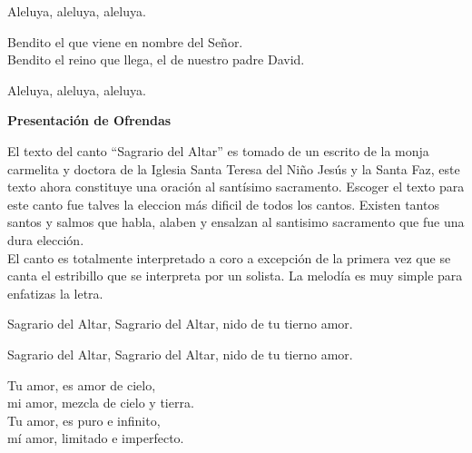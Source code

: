 \documentclass[12pt, letterpaper]{report}
\begin{document}
    \noindent
    \LARGE Aleluya, aleluya, aleluya.

    \noindent
    Bendito el que viene en nombre del Se\~nor.\\
    Bendito el reino que llega, el de nuestro padre David.

    \noindent
    Aleluya, aleluya, aleluya.
    \clearpage

    {%
\parindent 0pt
\noindent
\ifx\preLilyPondExample \undefined
\else
  \expandafter\preLilyPondExample
\fi
\def\lilypondbook{}%
%
\ifx\postLilyPondExample \undefined
\else
  \expandafter\postLilyPondExample
\fi
}
    \clearpage

    {%
\parindent 0pt
\noindent
\ifx\preLilyPondExample \undefined
\else
  \expandafter\preLilyPondExample
\fi
\def\lilypondbook{}%
%
\ifx\postLilyPondExample \undefined
\else
  \expandafter\postLilyPondExample
\fi
}
    \clearpage

    {%
\parindent 0pt
\noindent
\ifx\preLilyPondExample \undefined
\else
  \expandafter\preLilyPondExample
\fi
\def\lilypondbook{}%
%
\ifx\postLilyPondExample \undefined
\else
  \expandafter\postLilyPondExample
\fi
}
    \clearpage

    \begin{center}
      \LARGE \textbf{Presentaci\'on de Ofrendas}
    \end{center}

    \Large El texto del canto ``Sagrario del Altar'' es tomado de un escrito de la monja carmelita y doctora de la Iglesia Santa Teresa del Ni\~no Jes\'us y la Santa Faz, este texto ahora constituye una oraci\'on al sant\'isimo sacramento. Escoger el texto para este canto fue talves la eleccion m\'as dificil de todos los cantos. Existen tantos santos y salmos que habla, alaben y ensalzan al santisimo sacramento que fue una dura elecci\'on.\\
    El canto es totalmente interpretado a coro a excepci\'on de la primera vez que se canta el estribillo que se interpreta por un solista. La melod\'ia es muy simple para enfatizas la letra.

    \noindent
    \LARGE Sagrario del Altar, Sagrario del Altar, nido de tu tierno amor.

    \noindent
    Sagrario del Altar, Sagrario del Altar, nido de tu tierno amor.

    \noindent
    Tu amor, es amor de cielo,\\
    mi amor, mezcla de cielo y tierra.\\
    Tu amor, es puro e infinito,\\
    m\'i amor, limitado e imperfecto.
\end{document}

